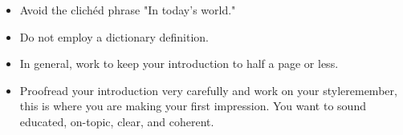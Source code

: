 \begin{itemize}
\item Avoid the clich\'ed phrase "In today's world."
        	
\item Do not employ a dictionary definition.
       	
\item In general, work to keep your introduction to half a page or less.    	  
 
\item Proofread your introduction very carefully and work on your style\textemdash remember, 
this is where you are making your first impression. You want to sound educated, 
on-topic, clear, and coherent.
 \end{itemize}
 
